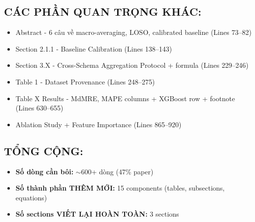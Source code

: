 \documentclass[11pt,a4paper]{article}
\begin{document}
\subsection*{CÁC PHẦN QUAN TRỌNG KHÁC:}
\begin{itemize}
    \item Abstract - 6 câu về macro-averaging, LOSO, calibrated baseline (Lines 73--82)
    \item Section 2.1.1 - Baseline Calibration (Lines 138--143)
    \item Section 3.X - Cross-Schema Aggregation Protocol + formula (Lines 229--246)
    \item Table 1 - Dataset Provenance (Lines 248--275)
    \item Table X Results - MdMRE, MAPE columns + XGBoost row + footnote (Lines 630--655)
    \item Ablation Study + Feature Importance (Lines 865--920)
\end{itemize}

\subsection*{TỔNG CỘNG:}
\begin{itemize}
    \item \textbf{Số dòng cần bôi:} $\sim$600+ dòng (47\% paper)
    \item \textbf{Số thành phần THÊM MỚI:} 15 components (tables, subsections, equations)
    \item \textbf{Số sections VIẾT LẠI HOÀN TOÀN:} 3 sections
\end{itemize}

\vspace{2em}
\begin{center}
\end{center}
\end{document}
